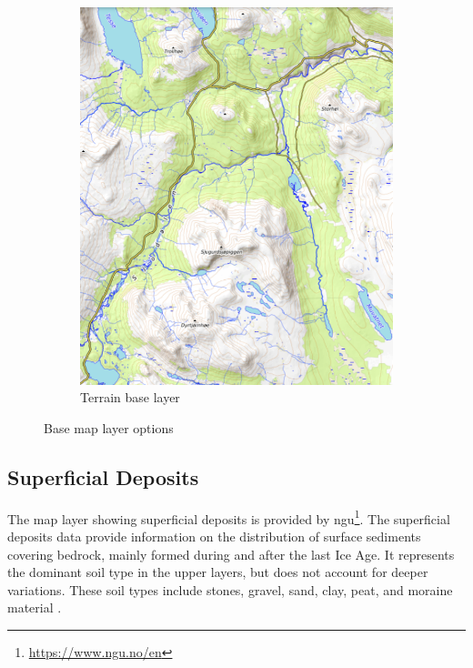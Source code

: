 \begin{figure}[h]
\begin{subfigure}[b]{0.45\textwidth}
         \includegraphics[width=\textwidth]{figures/base_layer_topo.pdf}
         \caption{Terrain base layer}
         \label{fig:maplayers:topolayer}
     \end{subfigure}
    \caption{Base map layer options}
    \label{fig:maplayer:baselayers}
\end{figure}

\subsection{Superficial Deposits}\label{subsec:superficialdeposits}
The map layer showing superficial deposits is provided by \acrfull{ngu}\footnote{\url{https://www.ngu.no/en}}. The superficial deposits data provide information on the distribution of surface sediments covering bedrock, mainly formed during and after the last Ice Age. It represents the dominant soil type in the upper layers, but does not account for deeper variations. These soil types include stones, gravel, sand, clay, peat, and moraine material \cite{geonorge_losmasser}. 

